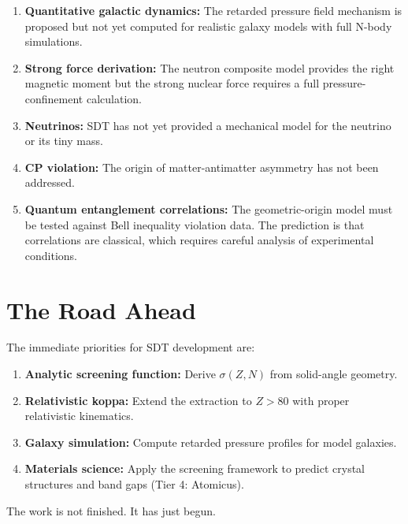 \begin{enumerate}
  \item \textbf{Quantitative galactic dynamics:} The retarded pressure field mechanism is proposed but not yet computed for realistic galaxy models with full N-body simulations.
  \item \textbf{Strong force derivation:} The neutron composite model provides the right magnetic moment but the strong nuclear force requires a full pressure-confinement calculation.
  \item \textbf{Neutrinos:} SDT has not yet provided a mechanical model for the neutrino or its tiny mass.
  \item \textbf{CP violation:} The origin of matter-antimatter asymmetry has not been addressed.
  \item \textbf{Quantum entanglement correlations:} The geometric-origin model must be tested against Bell inequality violation data. The prediction is that correlations are classical, which requires careful analysis of experimental conditions.
\end{enumerate}


\section{The Road Ahead}

The immediate priorities for SDT development are:
\begin{enumerate}
  \item \textbf{Analytic screening function:} Derive $\sigma(Z,N)$ from solid-angle geometry.
  \item \textbf{Relativistic koppa:} Extend the extraction to $Z > 80$ with proper relativistic kinematics.
  \item \textbf{Galaxy simulation:} Compute retarded pressure profiles for model galaxies.
  \item \textbf{Materials science:} Apply the screening framework to predict crystal structures and band gaps (Tier 4: Atomicus).
\end{enumerate}

The work is not finished. It has just begun.
